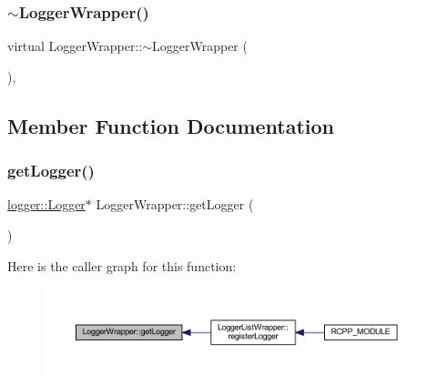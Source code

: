 \mbox{\label{class_logger_wrapper_ab56c41e4c4c07ea853aedf625e66e2b5}} 
\subsubsection{\texorpdfstring{$\sim$\+Logger\+Wrapper()}{~LoggerWrapper()}}
{\footnotesize\ttfamily virtual Logger\+Wrapper\+::$\sim$\+Logger\+Wrapper (\begin{DoxyParamCaption}{ }\end{DoxyParamCaption})\hspace{0.3cm}{\ttfamily [inline]}, {\ttfamily [virtual]}}



\subsection{Member Function Documentation}
\mbox{\label{class_logger_wrapper_afbd901f65ae9d2b11614c71265da41f1}} 
\subsubsection{\texorpdfstring{get\+Logger()}{getLogger()}}
{\footnotesize\ttfamily \mbox{\hyperlink{classlogger_1_1_logger}{logger\+::\+Logger}}$\ast$ Logger\+Wrapper\+::get\+Logger (\begin{DoxyParamCaption}{ }\end{DoxyParamCaption})\hspace{0.3cm}{\ttfamily [inline]}}

Here is the caller graph for this function\+:\nopagebreak
\begin{figure}[H]
\begin{center}
\leavevmode
\includegraphics[width=350pt]{class_logger_wrapper_afbd901f65ae9d2b11614c71265da41f1_icgraph}
\end{center}
\end{figure}
\mbox{\label{class_logger_wrapper_ad42b6f63cb509a7fa0d7e3aa82a95cb8}} 
